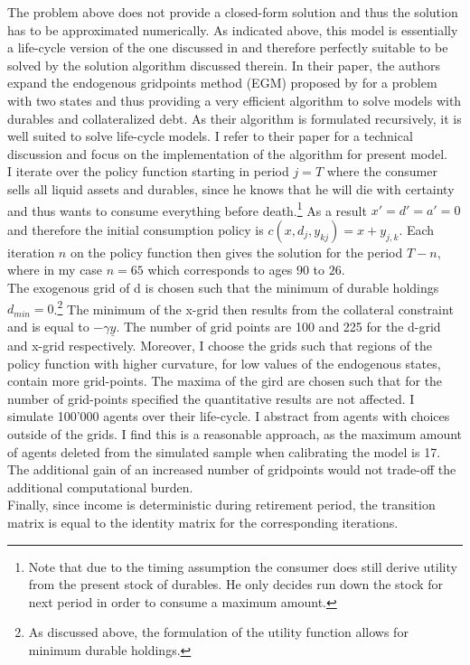 \documentclass[a4paper,12pt,legno]{article}
\begin{document}
The problem above does not provide a closed-form solution and thus the solution has to be approximated numerically. As indicated above, this model is essentially a life-cycle version of the one discussed in \cite{hintermaier2010} and therefore perfectly suitable to be solved by the solution algorithm discussed therein. In their paper, the authors expand the endogenous gridpoints method (EGM) proposed by \cite{carroll2006} for a problem with two states and thus providing a very efficient algorithm to solve models with durables and collateralized debt. As their algorithm is formulated recursively, it is well suited to solve life-cycle models. I refer to their paper for a technical discussion and focus on the implementation of the algorithm for present model.\\
I iterate over the policy function starting in period $j = T$ where the consumer sells all liquid assets and durables, since he knows that he will die with certainty and thus wants to consume everything before death.\footnote{Note that due to the timing assumption the consumer does still derive utility from the present stock of durables. He only decides run down the stock for next period in order to consume a maximum amount.} As a result $x'=d'=a'=0$ and therefore the initial consumption policy is $c(x,d_{j},y_{kj})=x+y_{j,k}$. Each iteration $n$ on the policy function then gives the solution for the period $T-n$, where in my case $n=65$ which corresponds to ages $90$ to $26$. \\
The exogenous grid of d is chosen such that the minimum of durable holdings $d_{min} = 0$.\footnote{As discussed above, the formulation of the utility function allows for minimum durable holdings.} The minimum of the x-grid then results from the collateral constraint and is equal to $-\gamma\underline{y}$. The number of grid points are 100 and 225 for the d-grid and x-grid respectively. Moreover, I choose the grids such that regions of the policy function with higher curvature, for low values of the endogenous states, contain more grid-points. The maxima of the gird are chosen such that for the number of grid-points specified the quantitative results are not affected. I simulate 100'000 agents over their life-cycle. I abstract from agents with choices outside of the grids. I find this is a reasonable approach, as the maximum amount of agents deleted from the simulated sample when calibrating the model is 17. The additional gain of an increased number of gridpoints would not trade-off the additional computational burden.\\
Finally, since income is deterministic during retirement period, the transition matrix is equal to the identity matrix for the corresponding iterations.
\end{document}
